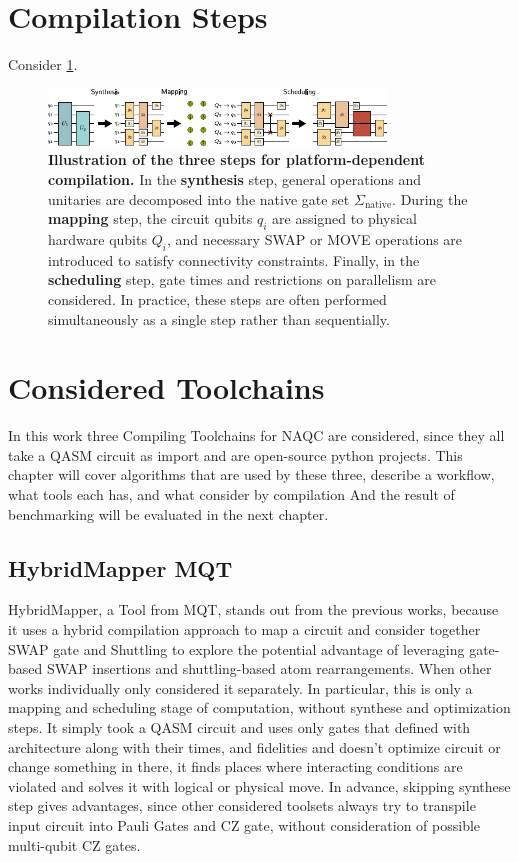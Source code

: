 \section{Compilation Steps}
Consider \ref{fig:compilation_steps}.
\begin{figure}[htbp]
  \centering
    \includegraphics[width=0.8\textwidth]{figures/compilation_steps.pdf}
    \caption[Illustration of the three steps for platform-dependent compilation]{\textbf{Illustration of the three steps for platform-dependent compilation.} In the \textbf{synthesis} step, general operations and unitaries are decomposed into the native gate set $\Sigma_{\mathrm{native}}$.
  During the \textbf{mapping} step, the circuit qubits $q_{i}$ are assigned to physical hardware qubits $Q_{i}$, and necessary SWAP or MOVE operations are introduced to satisfy connectivity constraints.
  Finally, in the \textbf{scheduling} step, gate times and restrictions on parallelism are considered.
  In practice, these steps are often performed simultaneously as a single step rather than sequentially. \parencite{Schmid_2024_NeutralAtomBasics}}
    \label{fig:compilation_steps}
\end{figure}

\section{Considered Toolchains}
In this work three Compiling Toolchains for \ac{NAQC} are considered, 
since they all take a QASM circuit as import and are open-source python projects.
This chapter will cover algorithms that are used by these three, 
describe a workflow, what tools each has, and what consider by compilation
And the result of benchmarking will be evaluated in the next chapter.

\subsection{HybridMapper MQT}
HybridMapper, a Tool from \ac{MQT}, stands out from the previous works, 
because it uses a hybrid compilation approach to map a circuit 
and consider together SWAP gate and Shuttling to explore the potential advantage of leveraging gate-based SWAP insertions 
and shuttling-based atom rearrangements.
When other works individually only considered it separately.
In particular, this is only a mapping and scheduling stage of computation, without synthese and optimization steps.
It simply took a QASM circuit and uses only gates that defined with architecture along with their times, and fidelities 
and doesn't optimize circuit or change something in there, it finds places where interacting conditions are violated 
and solves it with logical or physical move. 
In advance, skipping synthese step gives advantages, 
since other considered toolsets always try to transpile input circuit into Pauli Gates and CZ gate, without consideration of possible multi-qubit CZ gates.

